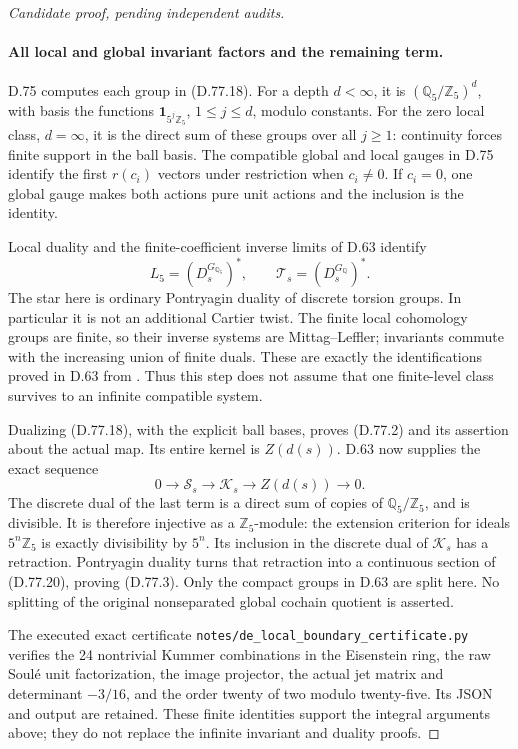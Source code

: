\begin{proof}[Candidate proof, pending independent audits]
\paragraph{All local and global invariant factors and the remaining term.}
D.75 computes each group in (D.77.18). For a depth \(d<\infty\),
it is \((\mathbb Q_5/\mathbb Z_5)^d\), with basis the functions
\(\mathbf1_{5^j\mathbb Z_5}\), \(1\le j\le d\), modulo constants.
For the zero local class, \(d=\infty\), it is the direct sum of
these groups over all \(j\ge1\): continuity forces finite support
in the ball basis. The compatible global and local gauges in
D.75 identify the first \(r(c_i)\) vectors under restriction
when \(c_i\ne0\). If \(c_i=0\), one global gauge makes both
actions pure unit actions and the inclusion is the identity.

Local duality and the finite-coefficient inverse limits of D.63
identify
\[
 L_5=(D_s^{G_{\mathbb Q_5}})^*,\qquad
 \mathcal T_s=(D_s^{G_{\mathbb Q}})^*.
                                                               \tag{D.77.19}
\]
The star here is ordinary Pontryagin duality of discrete torsion
groups. In particular it is not an additional Cartier twist.
The finite local cohomology groups are finite, so their inverse
systems are Mittag--Leffler; invariants commute with the increasing
union of finite duals. These are exactly the identifications
proved in D.63 from \cite[I.2.1, I.2.3, I.4.10]{DE_MilneADT}.
Thus this step does not assume that one finite-level class
survives to an infinite compatible system.

Dualizing (D.77.18), with the explicit ball bases, proves
(D.77.2) and its assertion about the actual map. Its entire
kernel is \(Z(d(s))\). D.63 now supplies the exact sequence
\[
 0\longrightarrow\mathcal S_s\longrightarrow\mathcal K_s
       \longrightarrow Z(d(s))\longrightarrow0.
                                                               \tag{D.77.20}
\]
The discrete dual of the last term is a direct sum of copies of
\(\mathbb Q_5/\mathbb Z_5\), and is divisible. It is therefore
injective as a \(\mathbb Z_5\)-module: the extension criterion
for ideals \(5^n\mathbb Z_5\) is exactly divisibility by \(5^n\).
Its inclusion in the discrete dual of \(\mathcal K_s\) has a
retraction. Pontryagin duality turns that retraction into a
continuous section of (D.77.20), proving (D.77.3).
Only the compact groups in D.63 are split here. No splitting
of the original nonseparated global cochain quotient is asserted.

The executed exact certificate
\texttt{notes/de\_local\_boundary\_certificate.py} verifies the 24
nontrivial Kummer combinations in the Eisenstein ring, the raw
Soul\'e unit factorization, the image projector, the actual jet
matrix and determinant \(-3/16\), and the order twenty of two
modulo twenty-five. Its JSON and output are retained. These finite
identities support the integral arguments above; they do not
replace the infinite invariant and duality proofs.
\end{proof}
